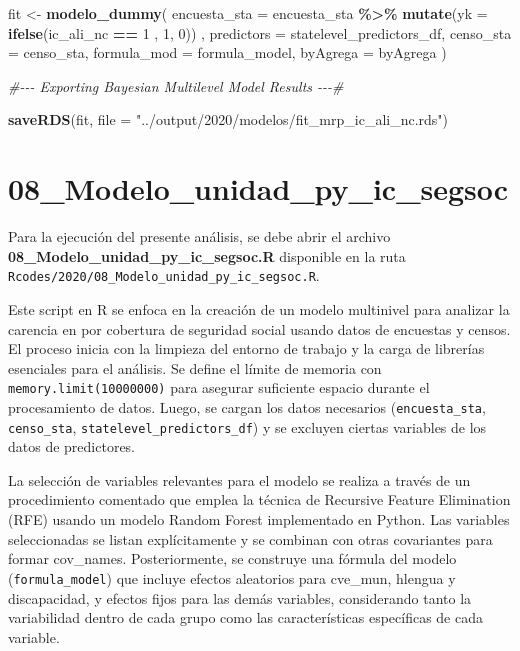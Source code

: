 \documentclass[
  12pt,
]{book}
\newenvironment{Shaded}{\begin{snugshade}}{\end{snugshade}}
\newcommand{\AttributeTok}[1]{\textcolor[rgb]{0.13,0.29,0.53}{#1}}
\newcommand{\CommentTok}[1]{\textcolor[rgb]{0.56,0.35,0.01}{\textit{#1}}}
\newcommand{\DecValTok}[1]{\textcolor[rgb]{0.00,0.00,0.81}{#1}}
\newcommand{\FunctionTok}[1]{\textcolor[rgb]{0.13,0.29,0.53}{\textbf{#1}}}
\newcommand{\NormalTok}[1]{#1}
\newcommand{\OtherTok}[1]{\textcolor[rgb]{0.56,0.35,0.01}{#1}}
\newcommand{\SpecialCharTok}[1]{\textcolor[rgb]{0.81,0.36,0.00}{\textbf{#1}}}
\newcommand{\StringTok}[1]{\textcolor[rgb]{0.31,0.60,0.02}{#1}}
\begin{document}
\begin{Shaded}
\begin{Highlighting}[]
\NormalTok{fit }\OtherTok{\textless{}{-}} \FunctionTok{modelo\_dummy}\NormalTok{(}
  \AttributeTok{encuesta\_sta =}\NormalTok{ encuesta\_sta }\SpecialCharTok{\%\textgreater{}\%}  
    \FunctionTok{mutate}\NormalTok{(}\AttributeTok{yk =} \FunctionTok{ifelse}\NormalTok{(ic\_ali\_nc }\SpecialCharTok{==} \DecValTok{1}\NormalTok{ , }\DecValTok{1}\NormalTok{, }\DecValTok{0}\NormalTok{))  ,}
  \AttributeTok{predictors =}\NormalTok{ statelevel\_predictors\_df,}
  \AttributeTok{censo\_sta =}\NormalTok{ censo\_sta,}
  \AttributeTok{formula\_mod =}\NormalTok{ formula\_model,}
  \AttributeTok{byAgrega =}\NormalTok{ byAgrega}
\NormalTok{)}

\CommentTok{\#{-}{-}{-} Exporting Bayesian Multilevel Model Results {-}{-}{-}\#}

\FunctionTok{saveRDS}\NormalTok{(fit, }
        \AttributeTok{file =} \StringTok{"../output/2020/modelos/fit\_mrp\_ic\_ali\_nc.rds"}\NormalTok{)}
\end{Highlighting}
\end{Shaded}

\hypertarget{modelo_unidad_py_ic_segsoc}{%
\chapter*{08\_Modelo\_unidad\_py\_ic\_segsoc}\label{modelo_unidad_py_ic_segsoc}}

Para la ejecución del presente análisis, se debe abrir el archivo \textbf{08\_Modelo\_unidad\_py\_ic\_segsoc.R} disponible en la ruta \texttt{Rcodes/2020/08\_Modelo\_unidad\_py\_ic\_segsoc.R}.

Este script en R se enfoca en la creación de un modelo multinivel para analizar la carencia en por cobertura de seguridad social usando datos de encuestas y censos. El proceso inicia con la limpieza del entorno de trabajo y la carga de librerías esenciales para el análisis. Se define el límite de memoria con \texttt{memory.limit(10000000)} para asegurar suficiente espacio durante el procesamiento de datos. Luego, se cargan los datos necesarios (\texttt{encuesta\_sta}, \texttt{censo\_sta}, \texttt{statelevel\_predictors\_df}) y se excluyen ciertas variables de los datos de predictores.

La selección de variables relevantes para el modelo se realiza a través de un procedimiento comentado que emplea la técnica de Recursive Feature Elimination (RFE) usando un modelo Random Forest implementado en Python. Las variables seleccionadas se listan explícitamente y se combinan con otras covariantes para formar cov\_names. Posteriormente, se construye una fórmula del modelo (\texttt{formula\_model}) que incluye efectos aleatorios para cve\_mun, hlengua y discapacidad, y efectos fijos para las demás variables, considerando tanto la variabilidad dentro de cada grupo como las características específicas de cada variable.
\end{document}
